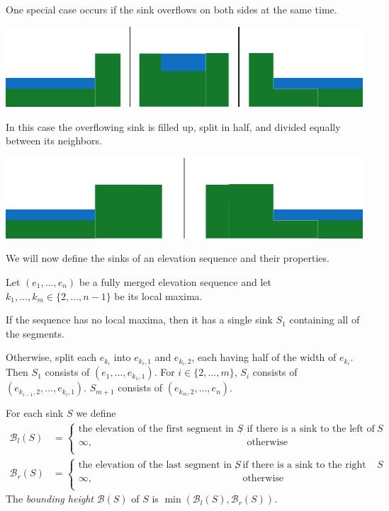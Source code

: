 \documentclass[11pt,a4paper]{article}
\begin{document}
One special case occurs if the sink overflows on both sides at the same time.
\begin{center}
  \includegraphics{im13.pdf}
\end{center}
In this case the overflowing sink is filled up, split in half, and divided equally between its neighbors.
\begin{center}
  \includegraphics{im14.pdf}
\end{center}

We will now define the sinks of an elevation sequence and their properties.

Let $(e_1,\ldots,e_n)$ be a fully merged elevation sequence and let $k_1,\ldots,k_m \in \{2,\ldots,n-1\}$ be its local maxima.

If the sequence has no local maxima, then it has a single sink $S_1$ containing all of the segments.

Otherwise, split each $e_{k_i}$ into $e_{k_i,1}$ and $e_{k_i,2}$, each having half of the width of $e_{k_i}$.
Then $S_1$ consists of $(e_1,\ldots,e_{k_1,1})$.
For $i\in\{2,\ldots,m\}$, $S_i$ consists of $(e_{k_{i-1},2},\ldots,e_{k_i,1})$.
$S_{m+1}$ consists of $(e_{k_m,2},\ldots,e_n)$.

For each sink $S$ we define
\begin{align*}
    \mathcal{B}_l(S) &=
        \begin{cases}
            \textrm{the elevation of the first segment in $S$}, & \textrm{if there is a sink to the left of $S$} \\
            \infty, & \textrm{otherwise} \\
        \end{cases} \\
    \mathcal{B}_r(S) &=
        \begin{cases}
            \textrm{the elevation of the last segment in $S$}, & \textrm{if there is a sink to the right of $S$} \\
            \infty, & \textrm{otherwise} \\
        \end{cases}
\end{align*}
The \textit{bounding height} $\mathcal{B}(S)$ of $S$ is $\min(\mathcal{B}_l(S), \mathcal{B}_r(S))$.
\end{document}
